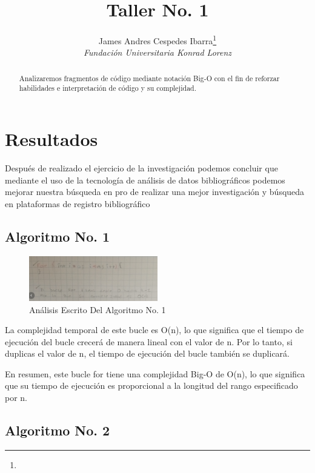 \documentclass[journal, spanish]{IEEEtran}
\title{Taller No. 1}
\author{James Andres Cespedes Ibarra\thanks{} \\
\textit{Fundación Universitaria Konrad Lorenz} \\
}
\begin{document}
\maketitle

\begin{abstract}

Analizaremos fragmentos de código mediante notación Big-O con el fin de reforzar habilidades e interpretación de código y su complejidad.

\end{abstract}

\section{Resultados}

Después de realizado el ejercicio de la investigación podemos concluir que mediante el uso de la tecnología de análisis de datos bibliográficos podemos mejorar nuestra búsqueda en pro de realizar una mejor investigación y búsqueda en plataformas de registro bibliográfico

\subsection{Algoritmo No. 1}

\begin{figure}[H]
  \centering
  \includegraphics[width=0.5\textwidth]{images/Captura de pantalla 2023-09-13 025749.png}
  \caption{Análisis Escrito Del Algoritmo No. 1}
  \label{fig:nombre_de_tu_imagen}
\end{figure}

La complejidad temporal de este bucle es O(n), lo que significa que el tiempo de ejecución del bucle crecerá de manera lineal con el valor de n. Por lo tanto, si duplicas el valor de n, el tiempo de ejecución del bucle también se duplicará.

En resumen, este bucle for tiene una complejidad Big-O de O(n), lo que significa que su tiempo de ejecución es proporcional a la longitud del rango especificado por n.

\subsection{Algoritmo No. 2}
\end{document}
